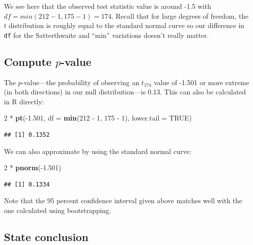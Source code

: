 \documentclass[]{tufte-book}
\newenvironment{Shaded}{\begin{snugshade}}{\end{snugshade}}
\newcommand{\KeywordTok}[1]{\textcolor[rgb]{0.13,0.29,0.53}{\textbf{{#1}}}}
\newcommand{\DataTypeTok}[1]{\textcolor[rgb]{0.13,0.29,0.53}{{#1}}}
\newcommand{\DecValTok}[1]{\textcolor[rgb]{0.00,0.00,0.81}{{#1}}}
\newcommand{\FloatTok}[1]{\textcolor[rgb]{0.00,0.00,0.81}{{#1}}}
\newcommand{\StringTok}[1]{\textcolor[rgb]{0.31,0.60,0.02}{{#1}}}
\newcommand{\OtherTok}[1]{\textcolor[rgb]{0.56,0.35,0.01}{{#1}}}
\newcommand{\NormalTok}[1]{{#1}}
\theoremstyle{definition}
\theoremstyle{definition}
\theoremstyle{remark}
\begin{document}
We see here that the observed test statistic value is around -1.5 with
\(df = min(212 - 1, 175 - 1) = 174\). Recall that for large degrees of
freedom, the \(t\) distribution is roughly equal to the standard normal
curve so our difference in \texttt{df} for the Satterthwaite and ``min''
variations doesn't really matter.

\subsection{\texorpdfstring{Compute
\(p\)-value}{Compute p-value}}\label{compute-p-value-2}

The \(p\)-value---the probability of observing an \(t_{174}\) value of
-1.501 or more extreme (in both directions) in our null
distribution---is 0.13. This can also be calculated in R directly:

\begin{Shaded}
\begin{Highlighting}[]
\DecValTok{2} \NormalTok{*}\StringTok{ }\KeywordTok{pt}\NormalTok{(-}\FloatTok{1.501}\NormalTok{, }\DataTypeTok{df =} \KeywordTok{min}\NormalTok{(}\DecValTok{212} \NormalTok{-}\StringTok{ }\DecValTok{1}\NormalTok{, }\DecValTok{175} \NormalTok{-}\StringTok{ }\DecValTok{1}\NormalTok{), }\DataTypeTok{lower.tail =} \OtherTok{TRUE}\NormalTok{)}
\end{Highlighting}
\end{Shaded}

\begin{verbatim}
## [1] 0.1352
\end{verbatim}

We can also approximate by using the standard normal curve:

\begin{Shaded}
\begin{Highlighting}[]
\DecValTok{2} \NormalTok{*}\StringTok{ }\KeywordTok{pnorm}\NormalTok{(-}\FloatTok{1.501}\NormalTok{)}
\end{Highlighting}
\end{Shaded}

\begin{verbatim}
## [1] 0.1334
\end{verbatim}

Note that the 95 percent confidence interval given above matches well
with the one calculated using bootstrapping.

\subsection{State conclusion}\label{state-conclusion-3}
\end{document}
